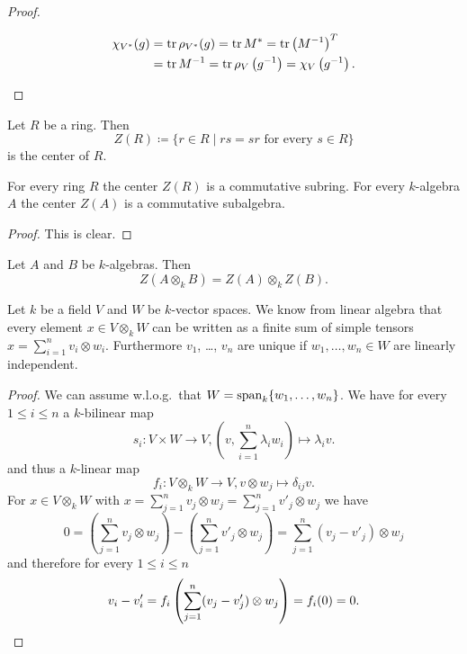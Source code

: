 \begin{proof}
\begin{enumerate}[label=\emph{\alph*)},leftmargin=*]
   \begin{align*}
    \chi_{V^*}(g)
    &= \operatorname{tr} \rho_{V^*}(g)
    = \operatorname{tr} M^*
    = \operatorname{tr} \left(M^{-1}\right)^T \\
    &= \operatorname{tr} M^{-1}
    = \operatorname{tr} \rho_V\left( g^{-1} \right)
    = \chi_V\left( g^{-1} \right).
    \qedhere
   \end{align*}
 \end{enumerate}
\end{proof}


\begin{defi}
 Let $R$ be a ring. Then
 \[
  Z(R) \coloneqq \{r \in R \mid rs = sr \text{ for every } s \in R\}
 \]
 is the center of $R$.
\end{defi}


\begin{lem}
 For every ring $R$ the center $Z(R)$ is a commutative subring. For every $k$-algebra $A$ the center $Z(A)$ is a commutative subalgebra.
\end{lem}
\begin{proof}
 This is clear.
\end{proof}


\begin{lem}\label{lem: Z(A o B) = Z(A) o Z(B)}
 Let $A$ and $B$ be $k$-algebras. Then
 \[
  Z(A \otimes_k B) = Z(A) \otimes_k Z(B).
 \]
\end{lem}


\begin{rec}
 Let $k$ be a field $V$ and $W$ be $k$-vector spaces. We know from linear algebra that every element $x \in V \otimes_k W$ can be written as a finite sum of simple tensors $x = \sum_{i=1}^n v_i \otimes w_i$. Furthermore $v_1$, \dots, $v_n$ are unique if $w_1, \dotsc, w_n \in W$ are linearly independent.
 \begin{proof}
  We can assume w.l.o.g.\ that $W = \operatorname{span}_k \{w_1, \dotsc, w_n\}$. We have for every $1 \leq i \leq n$ a $k$-bilinear map
  \[
   s_i \colon V \times W \to V, \left(v, \sum_{i=1}^n \lambda_i w_i\right) \mapsto \lambda_i v.
  \]
  and thus a $k$-linear map
  \[
   f_i \colon V \otimes_k W \to V, v \otimes w_j \mapsto \delta_{ij} v.
  \]
  For $x \in V \otimes_k W$ with $x = \sum_{j=1}^n v_j \otimes w_j = \sum_{j=1}^n v'_j \otimes w_j$ we have
  \[
   0
   = \left( \sum_{j=1}^n v_j \otimes w_j \right) - \left( \sum_{j=1}^n v'_j \otimes w_j \right)
   = \sum_{j=1}^n (v_j - v'_j) \otimes w_j
  \]
  and therefore for every $1 \leq i \leq n$
  \[
   v_i - v'_i = f_i\left( \sum_{j=1}^n (v_j - v'_j) \otimes w_j\right) = f_i(0) = 0.
   \qedhere
  \]
 \end{proof}
\end{rec}


